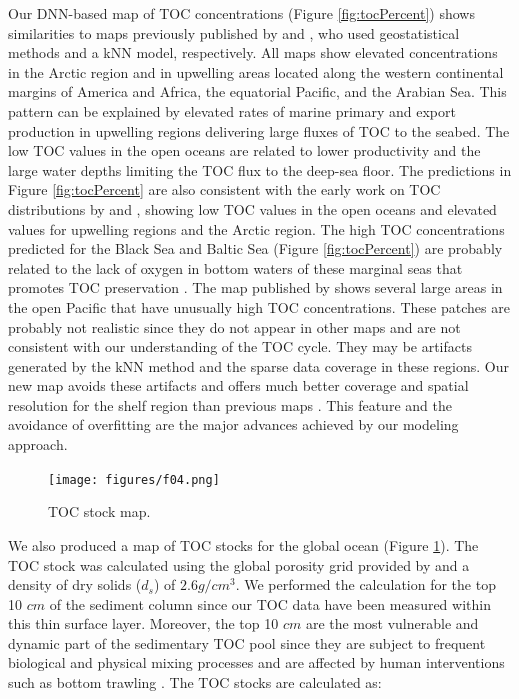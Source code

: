 \documentclass[journal abbreviation, manuscript]{copernicus}
\begin{document}
Our DNN-based map of TOC concentrations (Figure \ref{fig:tocPercent}) shows similarities to maps previously published by \cite{SEITER20042001} and \cite{LeeTOCkNN}, who used geostatistical methods and a kNN model, respectively. All maps show elevated concentrations in the Arctic region and in upwelling areas located along the western continental margins of America and Africa, the equatorial Pacific, and the Arabian Sea. This pattern can be explained by elevated rates of marine primary and export production in upwelling regions delivering large fluxes of TOC to the seabed. The low TOC values in the open oceans are related to lower productivity and the large water depths limiting the TOC flux to the deep-sea floor. The predictions in Figure \ref{fig:tocPercent} are also consistent with the early work on TOC distributions by \cite{Berner1982} and \cite{Emerson1988}, showing low TOC values in the open oceans and elevated values for upwelling regions and the Arctic region. The high TOC concentrations predicted for the Black Sea and Baltic Sea (Figure \ref{fig:tocPercent}) are probably related to the lack of oxygen in bottom waters of these marginal seas that promotes TOC preservation \citep{HEDGES199581}. The map published by \cite{LeeTOCkNN} shows several large areas in the open Pacific that have unusually high TOC concentrations. These patches are probably not realistic since they do not appear in other maps and are not consistent with our understanding of the TOC cycle. They may be artifacts generated by the kNN method and the sparse data coverage in these regions. Our new map avoids these artifacts and offers much better coverage and spatial resolution for the shelf region than previous maps \citep{SEITER20042001}. This feature and the avoidance of overfitting are the major advances achieved by our modeling approach.


\begin{figure}
        \centering
        \texttt{[image: figures/f04.png]}
        \caption{TOC stock map.}
        \label{fig:tocStock}
\end{figure}

We also produced a map of TOC stocks for the global ocean (Figure \ref{fig:tocStock}). The TOC stock was calculated using the global porosity grid provided by \cite{Martin2005Porosity} and a density of dry solids ($d_s$) of $2.6 g/cm^3$. We performed the calculation for the top 10 $cm$ of the sediment column since our TOC data have been measured within this thin surface layer. Moreover, the top 10 $cm$ are the most vulnerable and dynamic part of the sedimentary TOC pool since they are subject to frequent biological and physical mixing  processes \citep{song2022global} and are affected by human interventions such as bottom trawling \citep{Sala2021}. The TOC stocks are calculated as:
\end{document}
